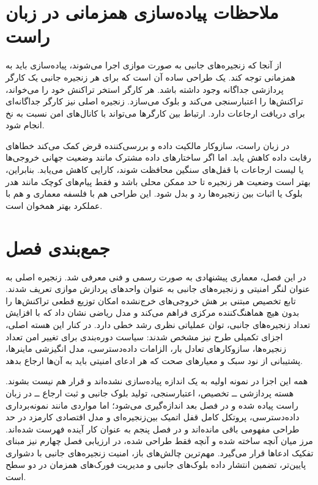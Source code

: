 \section{ملاحظات پیاده‌سازی همزمانی در زبان راست}

از آنجا که زنجیره‌های جانبی به صورت موازی اجرا می‌شوند، پیاده‌سازی باید به همزمانی توجه کند. یک طراحی ساده آن است که برای هر زنجیره جانبی یک کارگر پردازشی جداگانه وجود داشته باشد. هر کارگر استخر تراکنش خود را می‌خواند، تراکنش‌ها را اعتبارسنجی می‌کند و بلوک می‌سازد. زنجیره اصلی نیز کارگر جداگانه‌ای برای دریافت ارجاعات دارد. ارتباط بین کارگرها می‌تواند با کانال‌های امن نسبت به نخ انجام شود.

در زبان راست، سازوکار مالکیت داده و بررسی‌کننده قرض کمک می‌کند خطاهای رقابت داده کاهش یابد. اما اگر ساختارهای داده مشترک مانند وضعیت جهانی خروجی‌ها یا لیست ارجاعات با قفل‌های سنگین محافظت شوند، کارایی کاهش می‌یابد. بنابراین، بهتر است وضعیت هر زنجیره تا حد ممکن محلی باشد و فقط پیام‌های کوچک مانند هدر بلوک یا اثبات بین زنجیره‌ها رد و بدل شود. این طراحی هم با فلسفه معماری و هم با عملکرد بهتر همخوان است.

\section{جمع‌بندی فصل}

در این فصل، معماری پیشنهادی به صورت رسمی و فنی معرفی شد. زنجیره اصلی به عنوان لنگر امنیتی و زنجیره‌های جانبی به عنوان واحدهای پردازش موازی تعریف شدند. تابع تخصیص مبتنی بر هش خروجی‌های خرج‌نشده امکان توزیع قطعی تراکنش‌ها را بدون هیچ هماهنگ‌کننده مرکزی فراهم می‌کند و مدل ریاضی نشان داد که با افزایش تعداد زنجیره‌های جانبی، توان عملیاتی نظری رشد خطی دارد. در کنار این هسته اصلی، اجزای تکمیلی طرح نیز مشخص شدند: سیاست دوره‌بندی برای تغییر امن تعداد زنجیره‌ها، سازوکارهای تعادل بار، الزامات داده‌دسترسی، مدل انگیزشی ماینرها، پشتیبانی از نود سبک و معیارهای صحت که هر ادعای امنیتی باید به آن‌ها ارجاع بدهد.

همه این اجزا در نمونه اولیه به یک اندازه پیاده‌سازی نشده‌اند و قرار هم نیست بشوند. هسته پردازشی ــ تخصیص، اعتبارسنجی، تولید بلوک جانبی و ثبت ارجاع ــ در زبان راست پیاده شده و در فصل بعد اندازه‌گیری می‌شود؛ اما مواردی مانند نمونه‌برداری داده‌دسترسی، پروتکل کامل قفل اتمیک بین‌زنجیره‌ای و مدل اقتصادی کارمزد در حد طراحی مفهومی باقی مانده‌اند و در فصل پنجم به عنوان کار آینده فهرست شده‌اند. مرز میان آنچه ساخته شده و آنچه فقط طراحی شده، در ارزیابی فصل چهارم نیز مبنای تفکیک ادعاها قرار می‌گیرد. مهم‌ترین چالش‌های باز، امنیت زنجیره‌های جانبی با دشواری پایین‌تر، تضمین انتشار داده بلوک‌های جانبی و مدیریت فورک‌های همزمان در دو سطح است.
